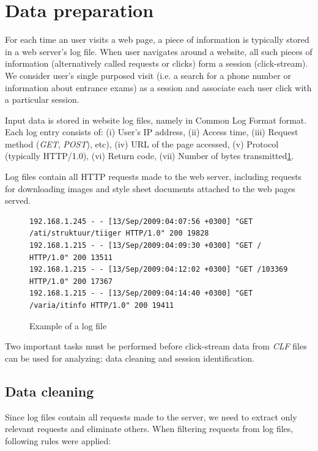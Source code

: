 \documentclass[12pt, english,a4paper]{article}
\begin{document}
\section{Data preparation} 
For each time an user visits a web page, a piece of information is typically stored in a web server's log file. When user navigates around a website, all such pieces of information (alternatively called requests or clicks) form a session (click-stream). We consider user's single purposed visit  (i.e. a search for a phone number or information about entrance exams) as a session and associate each user click with a particular session. 

Input data is stored in website log files, namely in Common Log Format\cite{ref_clf} format. Each log entry consists of:  (i) User's IP address, (ii) Access time, (iii) Request method (\emph{GET}, \emph{POST}), etc), (iv) URL of the page accessed, (v) Protocol (typically HTTP/1.0), (vi) Return code, (vii) Number of bytes transmitted\ref{log_sample}.

Log files contain all HTTP requests made to the web server, including requests for downloading images and style sheet documents attached to the web pages served.

\begin{figure}[h]
{\tiny
\begin{verbatim}
192.168.1.245 - - [13/Sep/2009:04:07:56 +0300] "GET /ati/struktuur/tiiger HTTP/1.0" 200 19828
192.168.1.215 - - [13/Sep/2009:04:09:30 +0300] "GET / HTTP/1.0" 200 13511
192.168.1.215 - - [13/Sep/2009:04:12:02 +0300] "GET /103369 HTTP/1.0" 200 17367
192.168.1.215 - - [13/Sep/2009:04:14:40 +0300] "GET /varia/itinfo HTTP/1.0" 200 19411
\end{verbatim}
}
\label{log_sample}
\caption{Example of a log file}
\end{figure}

Two important tasks must be performed before click-stream data from \emph{CLF} files can be used for analyzing: data cleaning and session identification.







\subsection{Data cleaning}
Since log files contain all requests made to the server, we need to extract only relevant requests and eliminate others. When filtering requests from log files, following rules were applied:
\end{document}
